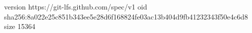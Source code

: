 version https://git-lfs.github.com/spec/v1
oid sha256:8a022e25c851b343ee5e28d6f168824fe03ac13b404d9fb41232343f50e4c6d8
size 15364
